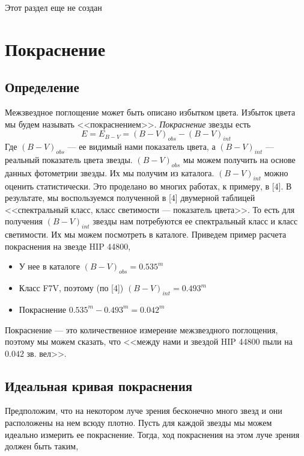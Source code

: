 \documentclass[14pt]{article}
\begin{document}
		Этот раздел еще не создан
    
    
    \section{Покраснение}
    
    
        \subsection{Определение}
            Межзвездное поглощение может быть описано избытком цвета. Избыток цвета мы будем называть <<покраснением>>. {\it Покраснение} звезды есть
        		$$
            		E = E_{B - V} = (B - V)_{obs} - (B - V)_{int}    
        		$$ 
            Где $(B - V)_{obs}$ --- ее видимый нами показатель цвета, а $(B - V)_{int}$ --- реальный показатель цвета звезды. $(B - V)_{obs}$ мы можем получить на основе данных фотометрии звезды. Их мы получим из каталога. $(B - V)_{int}$ можно оценить статистически. Это проделано во многих работах, к примеру, в [4]. В результате, мы воспользуемся полученной в [4] двумерной таблицей <<спектральный класс, класс светимости --- показатель цвета>>. То есть для получения $(B - V)_{int}$ звезды нам потребуются ее спектральный класс и класс светимости. Их мы можем посмотреть в каталоге. Приведем пример расчета покраснения на звезде HIP 44800,
        		\begin{itemize}
            		\item У нее в каталоге $(B - V)_{obs} = 0.535^m$
            		\item Класс F7V, поэтому (по [4]) $(B - V)_{int} = 0.493^m$
            		\item Покраснение $0.535^m - 0.493^m = 0.042^m$
        		\end{itemize}
        		Покраснение --- это количественное измерение межзвездного поглощения, поэтому мы можем сказать, что <<между нами и звездой HIP 44800 пыли на $0.042$ зв. вел>>.
        
        \subsection{Идеальная кривая покраснения}
            Предположим, что на некотором луче зрения бесконечно много звезд и они расположены на нем всюду плотно. Пусть для каждой звезды мы можем идеально измерить ее покраснение. Тогда, ход покраснения на этом луче зрения должен быть таким,
        		
\end{document}
